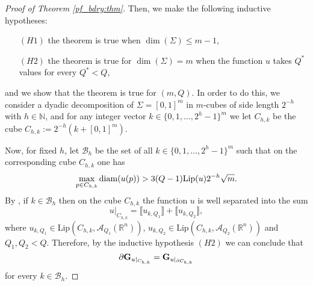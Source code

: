 \documentclass[a4paper,11pt,reqno]{amsart}
\theoremstyle{definition}
\numberwithin{equation}{section}
\numberwithin{subsection}{section}
\newcommand{\N}{\mathbb{N}}
\newcommand{\R}{\mathbb{R}}
\newcommand{\A}{\mathcal{A}}
\newcommand{\Lip}{\mathrm{Lip}}
\begin{document}
\begin{proof}[Proof of Theorem \ref{pf_bdry:thm}]
Then, we make the following inductive hypotheses:
\begin{itemize}
\item[$(H1)$] the theorem is true when $\dim(\Sigma) \leq m-1$,

\item[$(H2)$] the theorem is true for $\dim(\Sigma) = m$ when the function $u$ takes $Q^{*}$ values for every $Q^{*} < Q$,
\end{itemize}
and we show that the theorem is true for $\left( m,Q \right)$. In order to do this, we consider a dyadic decomposition of $\Sigma = \left[ 0,1 \right]^{m}$ in $m$-cubes of side length $2^{-h}$ with $h \in \N$, and for any integer vector $k \in \{ 0,1,\dots,2^{h}-1 \}^{m}$ we let $C_{h,k}$ be the cube $C_{h,k} := 2^{-h} \left( k + \left[ 0,1 \right]^{m} \right)$.

Now, for fixed $h$, let $\mathscr{B}_{h}$ be the set of all $k \in \{ 0,1,\dots,2^{h}-1 \}^{m}$ such that on the corresponding cube $C_{h,k}$ one has
\begin{equation} \label{pf_bdry:1}
\max_{p \in C_{h,k}} {\rm diam}(u(p)) > 3(Q-1)\Lip(u)2^{-h}\sqrt{m}.
\end{equation}  
By \cite[Proposition 1.6]{DLS11a}, if $k \in \mathscr{B}_{h}$ then on the cube $C_{h,k}$ the function $u$ is well separated into the sum
\begin{equation}
u|_{C_{h,k}} = \llbracket u_{k,Q_1} \rrbracket + \llbracket u_{k,Q_2} \rrbracket,
\end{equation}
where $u_{k,Q_1} \in \Lip(C_{h,k}, \A_{Q_1}(\R^n))$, $u_{k, Q_2} \in \Lip(C_{h,k}, \A_{Q_2}(\R^{n}))$ and $Q_{1}, Q_{2} < Q$. Therefore, by the inductive hypothesis $(H2)$ we can conclude that
\begin{equation} \label{pf_bdry:2}
\partial {\bf G}_{u|_{C_{h,k}}} = {\bf G}_{u|_{\partial C_{h,k}}}
\end{equation}
for every $k \in \mathscr{B}_{h}$.


\end{proof}
\end{document}
